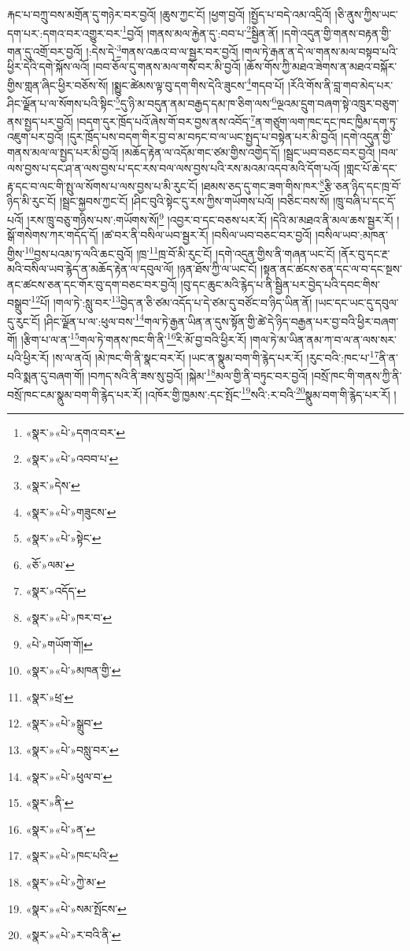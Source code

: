 རྐང་པ་བཀྲུ་བས་མགྲོན་དུ་གཉེར་བར་བྱའོ། །ཆུས་ཀྱང་ངོ། །ཕྱག་བྱའོ། །སྤྱོད་པ་བདེ་འམ་འདྲིའོ། །ཅི་ནུས་ཀྱིས་ཡང་དག་པར་:དགའ་བར་འགྱུར་བར་\footnote{«སྣར་»«པེ་»དགའ་བར་}བྱའོ། །གནས་མལ་རྐྱེན་དུ་:བབ་པ་\footnote{«སྣར་»«པེ་»འབབ་པ་}སྦྱིན་ནོ། །དགེ་འདུན་གྱི་གནས་བརྟན་གྱི་གན་དུ་འགྲོ་བར་བྱའོ། །:དེས་དེ་\footnote{«སྣར་»དེས་}གནས་འཆའ་བ་ལ་སྦྱར་བར་བྱའོ། །གལ་ཏེ་རྒན་ན་དེ་ལ་གནས་མལ་བསྟབ་པའི་ཕྱིར་དེའི་དགེ་སྐོས་ལའོ། །བབ་ཅོལ་དུ་གནས་མལ་གསོ་བར་མི་བྱའོ། །ཆོས་གོས་ཀྱི་མཐའ་ཟེགས་ན་མཐའ་བསྐོར་གྱིས་གླན་ཞིང་ཕྱིར་བཅོས་སོ། །སྨྱུང་ཚེམས་ལྟ་བུ་དག་གིས་དེའི་ཟུངས་\footnote{«སྣར་»«པེ་»གཟུངས་}གདབ་པོ། །རོའི་གོས་ནི་བླ་གབ་མེད་པར་ཤིང་ལྗོན་པ་ལ་སོགས་པའི་སྟིང་\footnote{«སྣར་»«པེ་»སྟེང་}དུ་ཉི་མ་བདུན་ནམ་བརྒྱད་དམ་ཁ་ཅིག་ལས་\footnote{«ཅོ་»ལམ་}ལྔའམ་དྲུག་བཞག་སྟེ་འཁྲུར་བཅུག་ནས་སྤྱད་པར་བྱའོ། །བདག་དུར་ཁྲོད་པའོ་ཞེས་གོ་བར་བྱས་ནས་འབོད་\footnote{«སྣར་»འདོད་}ན་གཙུག་ལག་ཁང་དང་ཁང་ཁྱིམ་དག་ཏུ་འཇུག་པར་བྱའོ། །དུར་ཁྲོད་པས་བདག་གིར་བྱ་བ་མ་བཏང་བ་ལ་ཡང་སྤྱད་པ་བསྟེན་པར་མི་བྱའོ། །དགེ་འདུན་གྱི་གནས་མལ་ལ་སྤྱད་པར་མི་བྱའོ། །མཆོད་རྟེན་ལ་འདོམ་གང་ཙམ་གྱིས་འགྱེད་དོ། །སྦྲང་ཡབ་བཅང་བར་བྱའོ། །བལ་ལས་བྱས་པ་དང་ཤ་ན་ལས་བྱས་པ་དང་རས་བལ་ལས་བྱས་པའི་རས་མའམ་འདབ་མའི་དོག་པའོ། །གླང་པོ་ཆེ་དང་རྟ་དང་བ་ལང་གི་སྤུ་ལ་སོགས་པ་ལས་བྱས་པ་མི་རུང་ངོ། །ཐམས་ཅད་དུ་གང་ཟག་གིས་ཁར་\footnote{«སྣར་»«པེ་»ཁར་བ་}རྩི་ཅན་ཉིད་དང་ཁྲ་བོ་ཉིད་མི་རུང་ངོ། །སྦྲང་སྐྱབས་ཀྱང་ངོ། །ཤིང་བུའི་སྟེང་དུ་རས་ཀྱིས་གཡོགས་པའོ། །བཅིང་བས་སོ། །ཁྲུ་བཞི་པ་དང་དོ་པའོ། །རས་ཁྲུ་བཅུ་གཉིས་པས་:གཡོགས་སོ།\footnote{«པེ་»གཡོག་གོ།} །འབྱར་བ་དང་བཅས་པར་རོ། །དེའི་མ་མཐའ་ནི་མལ་ཆས་སྦྱར་རོ། །སྒོ་གསེགས་ཀར་གདོད་དོ། །ཚ་བར་ནི་བསིལ་ཡབ་སྦྱར་རོ། །བསིལ་ཡབ་བཅང་བར་བྱའོ། །བསིལ་ཡབ་:མཁན་གྱིས་\footnote{«སྣར་»«པེ་»མཁན་གྱི་}བྱས་པའམ་ཏ་ལའི་ཆང་བུའོ། །ཁྲ་\footnote{«སྣར་»ཕྲ་}ཁྲ་བོ་མི་རུང་ངོ། །དགེ་འདུན་གྱིས་ནི་གཞན་ཡང་ངོ། །ནོར་བུ་དང་རྔ་མའི་བསིལ་ཡབ་རྙེད་ན་མཆོད་རྟེན་ལ་དབུལ་ལོ། །ཉན་ཐོས་ཀྱི་ལ་ཡང་ངོ། །སྟན་ནང་ཚངས་ཅན་དང་ལ་བ་དང་སྔས་ནང་ཚངས་ཅན་དང་གོར་བུ་དག་བཅང་བར་བྱའོ། །བུ་དང་ཆུང་མའི་རྙེད་པ་ནི་སྦྱིན་པར་བྱེད་པའི་དབང་གིས་བསྒྲུབ་\footnote{«སྣར་»«པེ་»སྒྲུབ་}པོ། །གལ་ཏེ་:སླུ་བར་\footnote{«སྣར་»«པེ་»བསླུ་བར་}བྱེད་ན་ཅི་ཙམ་འདོད་པ་དེ་ཙམ་དུ་བཙོང་བ་ཉིད་ཡིན་ནོ། །ཡང་དང་ཡང་དུ་དབུལ་དུ་རུང་ངོ། །ཤིང་ལྗོན་པ་ལ་:ཕུལ་བས་\footnote{«སྣར་»«པེ་»ཕུལ་བ་}གལ་ཏེ་རྒྱན་ཡིན་ན་དུས་སྟོན་གྱི་ཚེ་དེ་ཉིད་བརྒྱན་པར་བྱ་བའི་ཕྱིར་བཞག་གོ། །རྩིག་པ་ལ་ན་\footnote{«སྣར་»ནི་}གལ་ཏེ་གནས་ཁང་གི་ནི་\footnote{«སྣར་»«པེ་»ན་}རི་མོ་བྱ་བའི་ཕྱིར་རོ། །གལ་ཏེ་མ་ཡིན་ནམ་ཀ་བ་ལ་ན་ལས་སར་པའི་ཕྱིར་རོ། །ས་ལ་ནའོ། །མེ་ཁང་གི་ནི་སྣང་བར་རོ། །ཡང་ན་སྣུམ་བག་གི་རྙེད་པར་རོ། །རུང་བའི་:ཁང་པ་\footnote{«སྣར་»«པེ་»ཁང་པའི་}ནི་ན་བའི་སྨན་དུ་བཞག་གོ། །བཀད་སའི་ནི་ཟས་སུ་བྱའོ། །སྐེམ་\footnote{«སྣར་»«པེ་»ཀྱེ་མ་}མལ་གྱི་ནི་བཏུང་བར་བྱའོ། །བསྲོ་ཁང་གི་གནས་ཀྱི་ནི་བསྲོ་ཁང་ངམ་སྣུམ་བག་གི་རྙེད་པར་རོ། །འཁོར་གྱི་ཁྱམས་:དང་སྤོང་\footnote{«སྣར་»«པེ་»སམ་སྤོངས་}སའི་:ར་བའི་\footnote{«སྣར་»«པེ་»ར་བའི་ནི་}སྣུམ་བག་གི་རྙེད་པར་རོ། །
